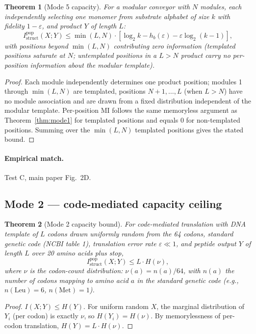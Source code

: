 \documentclass[11pt]{article}
\theoremstyle{plain}
\newtheorem{theorem}{Theorem}
\theoremstyle{definition}
\newcommand{\Istructpop}{I_{\mathrm{struct}}^{\mathrm{pop}}}
\newcommand{\Hbin}{h_b}
\begin{document}
\begin{theorem}[Mode 5 capacity]
\label{thm:mode5}
For a modular conveyor with $N$ modules, each independently selecting one monomer from substrate alphabet of size $k$ with fidelity $1 - \varepsilon$, and product $Y$ of length $L$:
\[
\Istructpop(X; Y) \le \min(L, N) \cdot \left[\log_2 k - \Hbin(\varepsilon) - \varepsilon \log_2 (k - 1)\right],
\]
with positions beyond $\min(L, N)$ contributing zero information (templated positions saturate at $N$; untemplated positions in a $L > N$ product carry no per-position information about the modular template).
\end{theorem}

\begin{proof}
Each module independently determines one product position; modules 1 through $\min(L, N)$ are templated, positions $N+1, \ldots, L$ (when $L > N$) have no module association and are drawn from a fixed distribution independent of the modular template. Per-position MI follows the same memoryless argument as Theorem~\ref{thm:mode1} for templated positions and equals 0 for non-templated positions. Summing over the $\min(L, N)$ templated positions gives the stated bound.
\end{proof}

\paragraph{Empirical match.} Test C, main paper Fig.~2D.

\subsection{Mode 2 --- code-mediated capacity ceiling}

\begin{theorem}[Mode 2 capacity bound]
\label{thm:mode2}
For code-mediated translation with DNA template of $L$ codons drawn uniformly random from the 64 codons, standard genetic code (NCBI table 1), translation error rate $\varepsilon \ll 1$, and peptide output $Y$ of length $L$ over 20 amino acids plus stop,
\[
\Istructpop(X; Y) \le L \cdot H(\nu),
\]
where $\nu$ is the codon-count distribution: $\nu(a) = n(a)/64$, with $n(a)$ the number of codons mapping to amino acid $a$ in the standard genetic code (e.g., $n(\mathrm{Leu}) = 6$, $n(\mathrm{Met}) = 1$).
\end{theorem}

\begin{proof}
$I(X; Y) \le H(Y)$. For uniform random $X$, the marginal distribution of $Y_i$ (per codon) is exactly $\nu$, so $H(Y_i) = H(\nu)$. By memorylessness of per-codon translation, $H(Y) = L \cdot H(\nu)$.
\end{proof}
\end{document}
